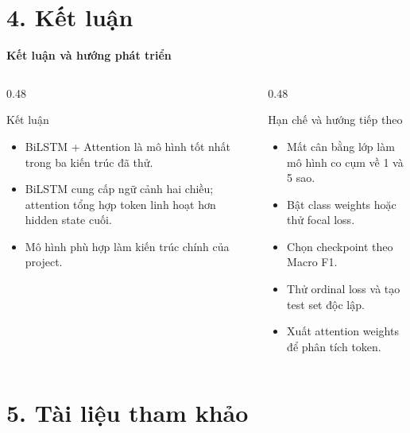 \documentclass[aspectratio=169]{beamer}
\begin{document}
\section{4. Kết luận}

\begin{frame}{\textbf{\large Kết luận và hướng phát triển}}
    \begin{columns}[T,onlytextwidth]
        \begin{column}{0.48\textwidth}
            \begin{block}{Kết luận}
                \begin{itemize}
                    \item BiLSTM + Attention là mô hình tốt nhất trong ba kiến
                    trúc đã thử.
                    \item BiLSTM cung cấp ngữ cảnh hai chiều; attention tổng hợp
                    token linh hoạt hơn hidden state cuối.
                    \item Mô hình phù hợp làm kiến trúc chính của project.
                \end{itemize}
            \end{block}
        \end{column}

        \begin{column}{0.48\textwidth}
            \begin{alertblock}{Hạn chế và hướng tiếp theo}
                \begin{itemize}
                    \item Mất cân bằng lớp làm mô hình co cụm về 1 và 5 sao.
                    \item Bật class weights hoặc thử focal loss.
                    \item Chọn checkpoint theo Macro F1.
                    \item Thử ordinal loss và tạo test set độc lập.
                    \item Xuất attention weights để phân tích token.
                \end{itemize}
            \end{alertblock}
        \end{column}
    \end{columns}
\end{frame}

\section{5. Tài liệu tham khảo}
\end{document}
